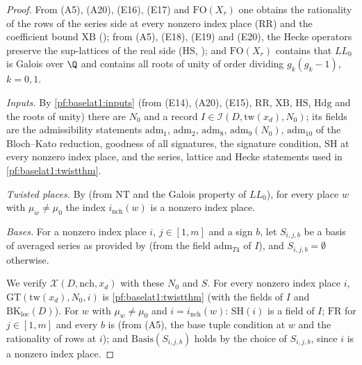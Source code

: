 \begin{proof}
From (A5), (A20), (E16), (E17) and
$\mathrm{FO}(X_r)$ one obtains the rationality of the rows of the series side at every nonzero index place
($\mathrm{RR}$) and the coefficient bound $\mathrm{XB}$
(); from (A5),
(E18), (E19) and (E20), the Hecke operators preserve the
sup-lattices of the real side ($\mathrm{HS}$, );
and $\mathrm{FO}(X_r)$ contains that $\mathit{LL}_0$ is Galois over $\Q$ and contains all roots of unity of
order dividing $g_k(g_k-1)$, $k=0,1$.

\emph{Inputs.} By \cref{pf:baselat1:inputs} (from (E14),
(A20), (E15), $\mathrm{RR}$, $\mathrm{XB}$, $\mathrm{HS}$,
$\mathrm{Hdg}$ and the roots of unity) there are $N_0$ and a record $I\in\mathcal{I}(D,\mathrm{tw}(x_d),N_0)$;
its fields are the admissibility statements $\mathrm{adm}_1$, $\mathrm{adm}_2$, $\mathrm{adm}_8$, $\mathrm{adm}_9(N_0)$,
$\mathrm{adm}_{10}$ of the Bloch--Kato reduction, goodness of all signatures, the signature condition, $\mathrm{SH}$
at every nonzero index place, and the series, lattice and Hecke statements used in \cref{pf:baselat1:twistthm}.

\emph{Twisted places.} By 
(from $\mathrm{NT}$ and the Galois property of $\mathit{LL}_0$), for every place $w$ with $\mu_w\ne\mu_0$ the
index $i_{\mathrm{nch}}(w)$ is a nonzero index place.

\emph{Bases.} For a nonzero index place $i$, $j\in[1,m]$ and a sign $b$, let $S_{i,j,b}$ be a basis of averaged
series as provided by  (from the field
$\mathrm{adm}_{T4}$ of $I$), and $S_{i,j,b}=\emptyset$ otherwise.

We verify $\mathcal{X}(D,\mathrm{nch},x_d)$ with these $N_0$ and $S$. For every nonzero index place $i$,
$\mathrm{GT}(\mathrm{tw}(x_d),N_0,i)$ is \cref{pf:baselat1:twistthm} (with the fields
of $I$ and $\mathrm{BK}_{\mathrm{loc}}(D)$). For $w$ with $\mu_w\ne\mu_0$ and $i=i_{\mathrm{nch}}(w)$:
$\mathrm{SH}(i)$ is a field of $I$; $\mathrm{FR}$ for $j\in[1,m]$ and every $b$ is
 (from (A5), the base tuple
condition at $w$ and the rationality of rows at $i$); and $\mathrm{Basis}(S_{i,j,b})$ holds by the choice of
$S_{i,j,b}$, since $i$ is a nonzero index place.
\end{proof}

